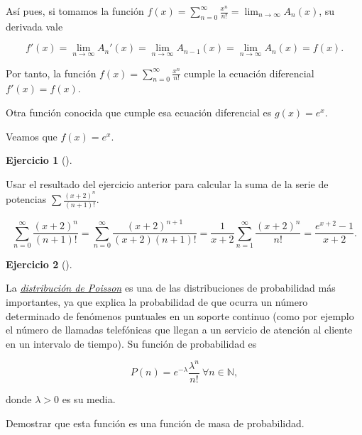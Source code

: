 \documentclass[
  spanish,
  a4paper,
]{scrreport}
\theoremstyle{definition}
\newtheorem{exercise}{Ejercicio}[chapter]
\theoremstyle{remark}
\begin{document}
\begin{tcolorbox}
Así pues, si tomamos la función
\(f(x)=\sum_{n=0}^\infty \frac{x^n}{n!} = \lim_{n\to\infty} A_n(x)\), su
derivada vale

\[
f'(x) = \lim_{n\to\infty} A_n'(x) = \lim_{n\to\infty} A_{n-1}(x) = \lim_{n\to\infty} A_{n}(x) = f(x).
\]

Por tanto, la función \(f(x)=\sum_{n=0}^\infty \frac{x^n}{n!}\) cumple
la ecuación diferencial \(f'(x)=f(x)\).

Otra función conocida que cumple esa ecuación diferencial es
\(g(x)=e^x\).

Veamos que \(f(x)=e^x\).

\end{tcolorbox}

\begin{exercise}[]\protect\hypertarget{exr-suma-serie-potencias}{}\label{exr-suma-serie-potencias}

Usar el resultado del ejercicio anterior para calcular la suma de la
serie de potencias \(\sum \frac{(x+2)^n}{(n+1)!}\).

\end{exercise}

\begin{tcolorbox}[enhanced jigsaw, arc=.35mm, bottomrule=.15mm, bottomtitle=1mm, breakable, colback=white, colbacktitle=quarto-callout-tip-color!10!white, colframe=quarto-callout-tip-color-frame, coltitle=black, left=2mm, leftrule=.75mm, opacityback=0, opacitybacktitle=0.6, rightrule=.15mm, title=\textcolor{quarto-callout-tip-color}{\faLightbulb}\hspace{0.5em}{Solución}, titlerule=0mm, toprule=.15mm, toptitle=1mm]

\[
\sum_{n=0}^\infty \frac{(x+2)^n}{(n+1)!} = \sum_{n=0}^\infty \frac{(x+2)^{n+1}}{(x+2)(n+1)!} = \frac{1}{x+2}\sum_{n=1}^\infty \frac{(x+2)^n}{n!} = \frac{e^{x+2}-1}{x+2}.
\]

\end{tcolorbox}

\begin{exercise}[]\protect\hypertarget{exr-serie-poisson}{}\label{exr-serie-poisson}

La
\href{https://es.wikipedia.org/wiki/Distribuci\%C3\%B3n_de_Poisson}{\emph{distribución
de Poisson}} es una de las distribuciones de probabilidad más
importantes, ya que explica la probabilidad de que ocurra un número
determinado de fenómenos puntuales en un soporte continuo (como por
ejemplo el número de llamadas telefónicas que llegan a un servicio de
atención al cliente en un intervalo de tiempo). Su función de
probabilidad es

\[
P(n)= e^{-\lambda}\frac{\lambda^n}{n!}\ \forall n\in \mathbb{N},
\]

donde \(\lambda>0\) es su media.

Demostrar que esta función es una función de masa de probabilidad.

\end{exercise}
\end{document}
